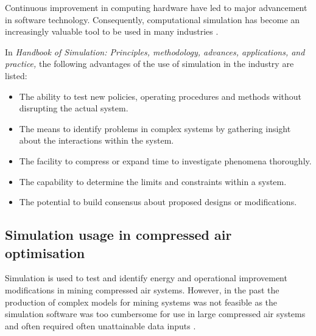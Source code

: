 		Continuous improvement in computing hardware have led to major advancement in software technology. Consequently, computational simulation has become an increasingly valuable tool to be used in many industries \cite{kocsis2003integration}.
		\par 
		In \textit{ Handbook of Simulation: Principles, methodology, advances, applications, and practice,} \cite{banks1998handbook} the following advantages of the use of simulation in the industry are listed: %
		\begin{itemize}
			\item The ability to test new policies, operating procedures and methods without disrupting the actual system.
			\item The means to identify problems in complex systems by gathering insight about the interactions within the system.
			\item The facility to compress or expand time to investigate phenomena thoroughly.
			\item The capability to determine the limits and constraints within a system.
			\item The potential to build consensus about proposed designs or modifications.
		\end{itemize}

	\subsection{Simulation usage in compressed air optimisation}
		Simulation is used to test and identify energy and operational improvement modifications in mining compressed air systems. However, in the past  the production of complex models for mining systems was not feasible as the simulation software was too cumbersome for use in large compressed air systems and often required often unattainable data inputs \cite{marais2013simplification}. 
		\par 
